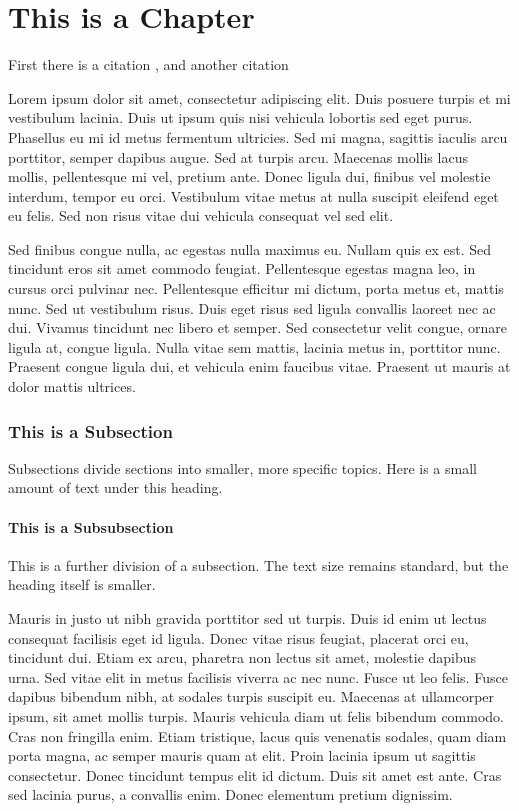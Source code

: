 \documentclass[
  digital,     %
  oneside,     %
  nosansbold,  %
  nocolorbold, %
  lof,         %
  lot,         %
]{fithesis4}
\begin{document}
\chapter{This is a Chapter}
First there is a citation \cite{borgman03}, and another citation \cite{ehlinger06}

Lorem ipsum dolor sit amet, consectetur adipiscing elit. Duis posuere turpis et mi vestibulum lacinia. Duis ut ipsum quis nisi vehicula lobortis sed eget purus. Phasellus eu mi id metus fermentum ultricies. Sed mi magna, sagittis iaculis arcu porttitor, semper dapibus augue. Sed at turpis arcu. Maecenas mollis lacus mollis, pellentesque mi vel, pretium ante. Donec ligula dui, finibus vel molestie interdum, tempor eu orci. Vestibulum vitae metus at nulla suscipit eleifend eget eu felis. Sed non risus vitae dui vehicula consequat vel sed elit.

Sed finibus congue nulla, ac egestas nulla maximus eu. Nullam quis ex est. Sed tincidunt eros sit amet commodo feugiat. Pellentesque egestas magna leo, in cursus orci pulvinar nec. Pellentesque efficitur mi dictum, porta metus et, mattis nunc. Sed ut vestibulum risus. Duis eget risus sed ligula convallis laoreet nec ac dui. Vivamus tincidunt nec libero et semper. Sed consectetur velit congue, ornare ligula at, congue ligula. Nulla vitae sem mattis, lacinia metus in, porttitor nunc. Praesent congue ligula dui, et vehicula enim faucibus vitae. Praesent ut mauris at dolor mattis ultrices.

\subsection{This is a Subsection}
Subsections divide sections into smaller, more specific topics. Here is a small amount of text under this heading.

\subsubsection{This is a Subsubsection}
This is a further division of a subsection. The text size remains standard, but the heading itself is smaller.

Mauris in justo ut nibh gravida porttitor sed ut turpis. Duis id enim ut lectus consequat facilisis eget id ligula. Donec vitae risus feugiat, placerat orci eu, tincidunt dui. Etiam ex arcu, pharetra non lectus sit amet, molestie dapibus urna. Sed vitae elit in metus facilisis viverra ac nec nunc. Fusce ut leo felis. Fusce dapibus bibendum nibh, at sodales turpis suscipit eu. Maecenas at ullamcorper ipsum, sit amet mollis turpis. Mauris vehicula diam ut felis bibendum commodo. Cras non fringilla enim. Etiam tristique, lacus quis venenatis sodales, quam diam porta magna, ac semper mauris quam at elit. Proin lacinia ipsum ut sagittis consectetur. Donec tincidunt tempus elit id dictum. Duis sit amet est ante. Cras sed lacinia purus, a convallis enim. Donec elementum pretium dignissim.
\end{document}
